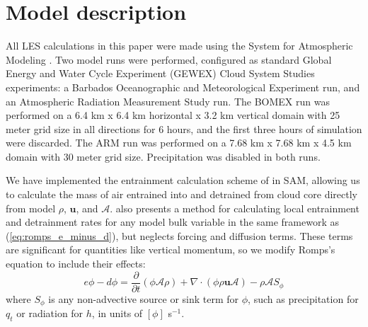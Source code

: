 \documentclass[12pt]{article}
\begin{document}

\section{Model description}

All LES calculations in this paper were made using the System for Atmospheric 
Modeling \citep[SAM;][]{Khairoutdinov2003}.  Two model runs were performed, 
configured as standard Global Energy and Water Cycle Experiment (GEWEX) 
Cloud System Studies \citep[GCSS;][]{Randall2003} experiments: a Barbados 
Oceanographic and Meteorological Experiment \citep[BOMEX;][]{Siebesma2003} run,
and an Atmospheric Radiation Measurement Study \citep[ARM;][]{Brown2002} run. 
The BOMEX run was performed on a 6.4 km x 6.4 km horizontal x 3.2 km vertical 
domain with 25 meter grid size in all directions for 6 hours, and the first 
three hours of simulation were discarded. The ARM run was performed on a 
7.68 km x 7.68 km x 4.5 km domain with 30 meter grid size.  Precipitation was 
disabled in both runs.

We have implemented the entrainment calculation scheme of \cite{Romps2010} in 
SAM, allowing us to calculate the mass of air entrained into and detrained from
cloud core directly from model $\rho$, $\mathbf{u}$, and $\mathcal{A}$.  
\citet[eq. 4]{Romps2010} also presents a method for calculating local 
entrainment and detrainment rates for any model bulk variable in the same
framework as (\ref{eq:romps_e_minus_d}), but neglects forcing and diffusion
terms.  These terms are significant for quantities like vertical momentum, so 
we modify Romps's equation to include their effects:
\begin{equation}
  \label{eq:romps_ephi_minus_dphi}
  e\phi - d\phi = \frac{\partial}{\partial t}(\phi \mathcal{A} \rho) 
                + \nabla \cdot (\phi \rho \mathbf{u} \mathcal{A})
                - \rho \mathcal{A}S_\phi
\end{equation}
where $S_\phi$ is any non-advective source or sink term for $\phi$, such as 
precipitation for $q_t$ or radiation for $h$, in units of $[\phi]$ s$^{-1}$.  
\end{document}
